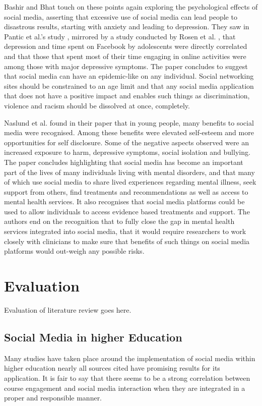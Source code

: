 \documentclass[lettersize,journal]{IEEEtran}
\begin{document}
    Bashir and Bhat \cite{Bashir et al 2017} touch on these points again exploring the psychological effects
    of social media, asserting that excessive use of social media can lead people to disastrous results, starting
    with anxiety and leading to depression. They saw in Pantic et al.'s study \cite{Pantic et al 2012}, mirrored
    by a study conducted by Rosen et al. \cite{Rosen et al 2013}, that depression and time spent on Facebook by
    adolescents were directly correlated and that those that spent most of their time engaging in online activities
    were among those with major depressive symptoms. The paper concludes to suggest that social media can have an
    epidemic-like on any individual. Social networking sites should be constrained to an age limit and that any
    social media application that does not have a positive impact and enables such things as discrimination, violence
    and racism should be dissolved at once, completely.

    Naslund et al. \cite{Naslund et al 2020} found in their paper that in young people, many benefits to social
    media were recognised. Among these benefits were elevated self-esteem and more opportunities for self
    disclosure. Some of the negative aspects observed were an increased exposure to harm, depressive symptoms,
    social isolation and bullying. The paper concludes highlighting that social media has become an important part
    of the lives of many individuals living with mental disorders, and that many of which use social media to share
    lived experiences regarding mental illness, seek support from others, find treatments and recommendations as
    well as access to mental health services. It also recognises that social media platforms could be used to
    allow individuals to access evidence based treatments and support. The authors end on the recognition that to
    fully close the gap in mental health services integrated into social media, that it would require researchers
    to work closely with clinicians to make sure that benefits of such things on social media platforms would
    out-weigh any possible risks.
\section{Evaluation}
	Evaluation of literature review goes here.
	\subsection{Social Media in higher Education}
	Many studies have taken place around the implementation of social media within higher education nearly all sources cited 
	have promising results for its application. It is fair to say that there seems to be a strong correlation between course engagement 
	and social media interaction when they are integrated in a proper and responsible manner.
\end{document}
